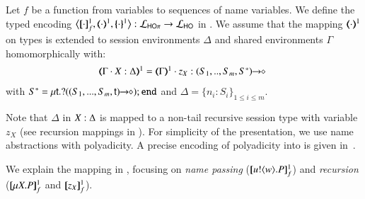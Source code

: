 \begin{definition}
\label{d:enc:hopitoho}
Let $f$ be a function from variables to sequences of name variables.
%
We define the typed encoding 
$\enco{\map{\cdot}^{1}_f, \mapt{\cdot}^{1}, \mapa{\cdot}^{1}}: \tyl{L}_{\HOp} \to \tyl{L}_{\HO}$ in 
. 
We assume that the mapping $(\!\!\langle\cdot\rangle\!\!)^{1}$ on types is extended to 
session environments $\Delta$
and
shared environments $\Gamma$ homomorphically with: 
\[
	\begin{array}{l}
		\tmap{\Gamma \cat \varp{X}:\Delta}{1}  =  \tmap{\Gamma}{1} \cat z_X:\shot{(S_1,..,S_m,S^*)} \ 
	\end{array}
\]
with
$S^* = \mu\mathsf{t}.? ((S_1,...,S_m,\mathsf{t})\!\! \rightarrow\!\! \diamond) ; \mathtt{end}$
and $\Delta = \{n_i:S_i\}_{1\leq i\leq m}$. 
\end{definition}

\smallskip 
\noi Note that $\Delta$ in $X:\Delta$ is mapped to a non-tail
recursive session type with variable $z_X$ (see recursion mappings in ).
For simplicity of the presentation, %
we use name abstractions with polyadicity.
A precise encoding of polyadicity into \HO is given in~.

We explain the mapping in , focusing 
on {\em name passing} ($[\!\![u ! \langle w \rangle . P]\!\!]^1_f$) and  
{\em recursion} ($[\!\![\mu X. P]\!\!]^1_f$ and $[\!\![z_X]\!\!]^1_f$). 

